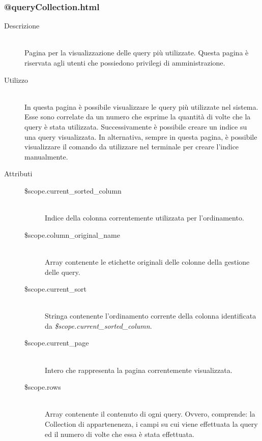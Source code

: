 \subsubsection{@queryCollection.html}
\begin{description}
	\item[Descrizione] \hfill \\
	Pagina per la visualizzazione delle query più utilizzate. Questa pagina è riservata agli utenti che possiedono privilegi di amministrazione.
	\item[Utilizzo] \hfill \\
	In questa pagina è possibile visualizzare le query più utilizzate nel sistema. Esse sono correlate da un numero che esprime la quantità di volte che la query è stata utilizzata. Successivamente è possibile creare un indice su una query visualizzata. In alternativa, sempre in questa pagina, è possibile visualizzare il comando da utilizzare nel terminale per creare l'indice manualmente.
	\item[Attributi] \hfill
 	\begin{description}
 		\item[\$scope.current\_sorted\_column] \hfill \\
 		Indice della colonna correntemente utilizzata per l'ordinamento.
 		\item[\$scope.column\_original\_name] \hfill \\
		Array contenente le etichette originali delle colonne della gestione delle query.
		\item[\$scope.current\_sort] \hfill \\
		Stringa contenente l'ordinamento corrente della colonna identificata da \textit{\$scope.current\_sorted\_column}.
		\item[\$scope.current\_page] \hfill \\
		Intero che rappresenta la pagina correntemente visualizzata.
		\item[\$scope.rows] \hfill \\
		Array contenente il contenuto di ogni query. Ovvero, comprende: la Collection di apparteneneza, i campi su cui viene effettuata la query ed il numero di volte che essa è stata effettuata.
 	\end{description}
\end{description}

